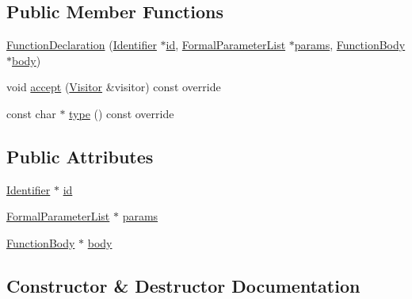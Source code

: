 \subsection*{Public Member Functions}
\begin{DoxyCompactItemize}
\item 
\hyperlink{struct_function_declaration_a2760e02567ddf39823e4a0b9a69898fa}{Function\+Declaration} (\hyperlink{struct_identifier}{Identifier} $\ast$\hyperlink{struct_function_declaration_a58de81497de15b01a5f92632c3e6f354}{id}, \hyperlink{struct_formal_parameter_list}{Formal\+Parameter\+List} $\ast$\hyperlink{struct_function_declaration_ab22f1972d3575c2b95778545d871658b}{params}, \hyperlink{struct_function_body}{Function\+Body} $\ast$\hyperlink{struct_function_declaration_ae35697bf8c8a45e490fa352d77a0c19b}{body})
\item 
void \hyperlink{struct_function_declaration_ada618c9934e5706066e5521afeada149}{accept} (\hyperlink{struct_visitor}{Visitor} \&visitor) const override
\item 
const char $\ast$ \hyperlink{struct_function_declaration_aff2da7f2c794e8ce1c3c7c15e9f88eb7}{type} () const override
\end{DoxyCompactItemize}
\subsection*{Public Attributes}
\begin{DoxyCompactItemize}
\item 
\hyperlink{struct_identifier}{Identifier} $\ast$ \hyperlink{struct_function_declaration_a58de81497de15b01a5f92632c3e6f354}{id}
\item 
\hyperlink{struct_formal_parameter_list}{Formal\+Parameter\+List} $\ast$ \hyperlink{struct_function_declaration_ab22f1972d3575c2b95778545d871658b}{params}
\item 
\hyperlink{struct_function_body}{Function\+Body} $\ast$ \hyperlink{struct_function_declaration_ae35697bf8c8a45e490fa352d77a0c19b}{body}
\end{DoxyCompactItemize}


\subsection{Constructor \& Destructor Documentation}
\mbox{\label{struct_function_declaration_a2760e02567ddf39823e4a0b9a69898fa}} 
